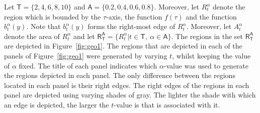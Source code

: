 \documentclass[twoside,reqno,11pt]{fcaa-var} %
\begin{document}


\noindent
Let $\mathsf{T}=\{2,4,6,8,10\}$ and $\mathsf{A} = \{0.2,0.4,0.6,0.8\}$. Moreover, let $R_{t}^{\alpha}$ denote the region which is bounded by the $\tau$-axis, the function $f(\tau)$ and the function $b_{t}^{\alpha}(y)$. Note that $b_{t}^{\alpha}(y)$ forms the 
right-most edge of $R_{t}^{\alpha}$. Moreover, let $A_{t}^{\alpha}$ denote the area of $R_{t}^{\alpha}$ and let $\mathsf{R}_{\mathsf{T}}^{\mathsf{A}}=\{R_t^{\alpha}|t\in\mathsf{T},~\alpha\in\mathsf{A}\}$. The regions in the set $\mathsf{R}_{\mathsf{T}}^{\mathsf{A}}$ are depicted in Figure~\ref{fig:geo1}. The regions that are depicted in each of the panels of Figure~\ref{fig:geo1} were generated by varying $t$, whilst keeping the value of $\alpha$ fixed. The title of each panel indicates which $\alpha$-value was used to generate the regions depicted in each panel. The only difference between the regions located in each panel is their right edges. The right edges of the regions in each panel are depicted using varying shades of gray. The lighter the shade with which an edge is depicted, the larger the $t$-value is that is associated with it.\\
\end{document}
